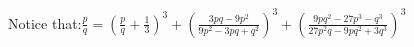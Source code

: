 \documentclass[preview]{standalone}
\begin{document}
\begin{center}
Notice that:$ \frac{p}{q} = \left( \frac{p}{q} + \frac{1}{3} \right)^3 + \left( \frac{3pq - 9p^2}{9p^2 - 3pq + q^2} \right)^3 + \left( \frac{9pq^2 - 27p^3 - q^3}{27p^2q - 9pq^2 + 3q^3} \right)^3 $
\end{center}
\end{document}
